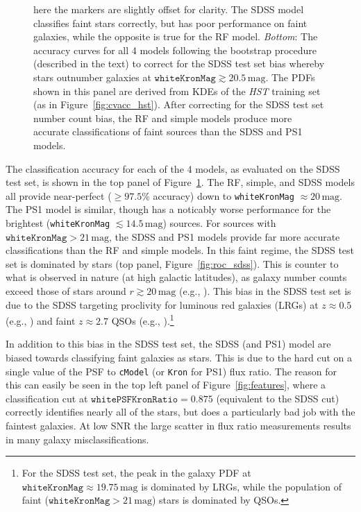 \documentclass[twocolumn, dvipdfmx]{aastex62}
\begin{document}
\begin{figure}[htb]
{  here the markers are slightly offset for clarity. The SDSS model
  classifies faint stars correctly, but has poor performance on faint
  galaxies, while the opposite is true for the RF model.
  \textit{Bottom}: The accuracy curves for all 4 models following the
  bootstrap procedure (described in the text) to correct for the SDSS test
  set bias whereby stars outnumber galaxies at $\mathtt{whiteKronMag}
  \gtrsim 20.5\,\mathrm{mag}$. The PDFs shown in this panel are derived from
  KDEs of the \textit{HST} training set (as in Figure~\ref{fig:cvacc_hst}).
  After correcting for the SDSS test set number count bias, the RF and
  simple models produce more accurate classifications of faint sources than
  the SDSS and PS1 models.}
  \label{fig:acc_sdss}
\end{figure}

The classification accuracy for each of the 4 models, as evaluated on the
SDSS test set, is shown in the top panel of Figure~\ref{fig:acc_sdss}. The
RF, simple, and SDSS models all provide near-perfect ($\ge 97.5$\% accuracy)
down to \texttt{whiteKronMag} $\approx 20\,\mathrm{mag}$. The PS1 model is
similar, though has a noticably worse performance for the brightest
(\texttt{whiteKronMag} $\lesssim 14.5\,\mathrm{mag}$) sources. For sources
with $\mathtt{whiteKronMag} > 21\,\mathrm{mag}$, the SDSS and PS1 models
provide far more accurate classifications than the RF and simple models. In
this faint regime, the SDSS test set is dominated by stars (top panel,
Figure~\ref{fig:roc_sdss}). This is counter to what is observed in nature
(at high galactic latitudes), as galaxy number counts exceed those of stars
around $r \gtrsim 20\,\mathrm{mag}$ (e.g., \citealt{Yasuda01,Shanks15}).
This bias in the SDSS test set is due to the SDSS targeting proclivity for
luminous red galaxies (LRGs) at $z \approx 0.5$ (e.g.,
\citealt{Eisenstein01}) and faint $z \approx 2.7$ QSOs (e.g.,
\citealt{Ross12}).\footnote{For the SDSS test set, the peak in the galaxy
PDF at $\mathtt{whiteKronMag} \approx 19.75\,\mathrm{mag}$ is dominated by
LRGs, while the population of faint ($\mathtt{whiteKronMag} >
21\,\mathrm{mag}$) stars is dominated by QSOs.}

In addition to this bias in the SDSS test set, the SDSS (and PS1) model are
biased towards classifying faint galaxies as stars. This is due to the hard
cut on a single value of the PSF to \texttt{cModel} (or \texttt{Kron} for
PS1) flux ratio. The reason for this can easily be seen in the top left
panel of Figure~\ref{fig:features}, where a classification cut at
$\mathtt{whitePSFKronRatio} = 0.875$ (equivalent to the SDSS cut) correctly
identifies nearly all of the stars, but does a particularly bad job with the
faintest galaxies. At low SNR the large scatter in flux ratio measurements
results in many galaxy misclassifications.
\end{document}
